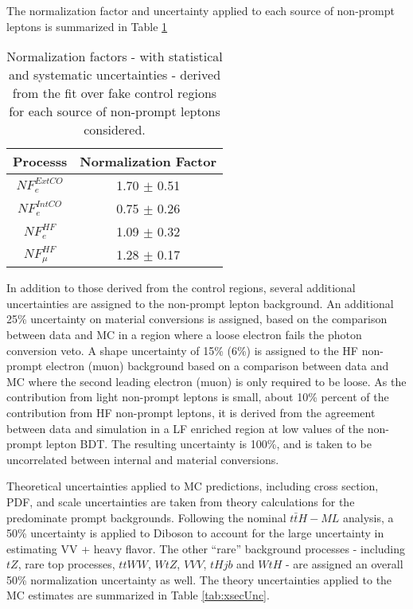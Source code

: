 The normalization factor and uncertainty applied to each source of non-prompt leptons is summarized in Table \ref{tab:fakeNF}

\begin{table}[H]
\begin{center}
\begin{tabular}{c|c}
\hline\hline
Processs &  Normalization Factor\\
\hline
$NF_e^{ExtCO}$ & 1.70 $\pm$ 0.51 \\
$NF_e^{IntCO}$ & 0.75 $\pm$ 0.26 \\
$NF_e^{HF}$ & 1.09 $\pm$ 0.32 \\
$NF_{\mu}^{HF}$ & 1.28 $\pm$ 0.17 \\
\hline
\end{tabular}
\label{tab:fakeNF}
\caption{Normalization factors - with statistical and systematic uncertainties - derived from the fit over fake control regions for each source of non-prompt leptons considered.}
\end{center}
\end{table}


In addition to those derived from the control regions, several additional uncertainties are assigned to the non-prompt lepton background. An additional 25\% uncertainty on material conversions is assigned, based on the comparison between data and MC in a region where a loose electron fails the photon conversion veto. A shape uncertainty of 15\% (6\%) is assigned to the HF non-prompt electron (muon) background based on a comparison between data and MC where the second leading electron (muon) is only required to be loose. As the contribution from light non-prompt leptons is small, about 10\% percent of the contribution from HF non-prompt leptons, it is derived from the agreement between data and simulation in a LF enriched region at low values of the non-prompt lepton BDT. The resulting uncertainty is 100\%, and is taken to be uncorrelated between internal and material conversions.

Theoretical uncertainties applied to MC predictions, including cross section, PDF, and scale uncertainties are taken from theory calculations for the predominate prompt backgrounds. Following the nominal $t\bar{t}H-ML$ analysis, a 50\% uncertainty is applied to Diboson to account for the large uncertainty in estimating VV + heavy flavor. The other ``rare'' background processes - including $tZ$, rare top processes, $ttWW$, $WtZ$, $VVV$, $tHjb$ and $WtH$ - are assigned an overall 50\% normalization uncertainty as well. The theory uncertainties applied to the MC estimates are summarized in Table \ref{tab:xsecUnc}.

